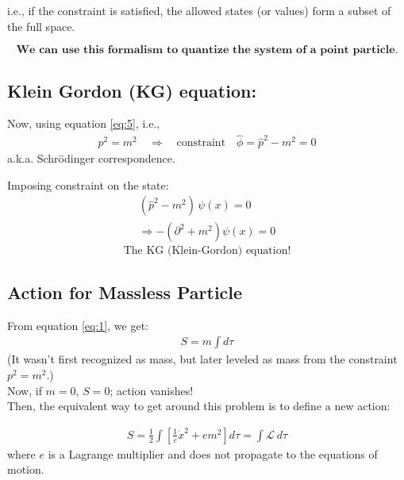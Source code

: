 \documentclass[14pt]{article} %
\begin{document}
i.e., if the constraint is satisfied, the allowed states (or values) form a subset of the full space.

$$ \textbf{We can use this formalism to quantize the system of a point particle.} $$
\subsection*{Klein Gordon (KG) equation:}
Now, using equation \eqref{eq:5}, i.e.,
\begin{align*}
p^2 = m^2 \quad \Rightarrow \quad \text{constraint} \quad \hat{\phi} = \hat{p}^2 - m^2 = 0
\end{align*}
a.k.a. Schrödinger correspondence.

Imposing constraint on the state:
\begin{align*}
    (\hat{p}^2 - m^2) \, \psi(x) = 0 \\
    \Rightarrow - (\partial^2 + m^2) \psi(x) = 0
\end{align*}
$$ \text{The KG (Klein-Gordon) equation!} $$
\subsection{Action for Massless Particle}
From equation \eqref{eq:1}, we get:
\begin{align*}
S = m \int d\tau
\end{align*}
(It wasn't first recognized as mass, but later leveled as mass from the constraint $p^2 = m^2$.)\\

Now, if $m=0$, $S=0$; action vanishes!\\

Then, the equivalent way to get around this problem is to define a new action:

\begin{align*}
S = \frac{1}{2} \int \left[ \frac{1}{e} \dot{x}^2 + e m^2 \right] d\tau =\int \mathcal{L}~ d \tau \tag{8} \label{eq:8}
\end{align*}
where $e$ is a Lagrange multiplier and does not propagate to the equations of motion.
\end{document}
